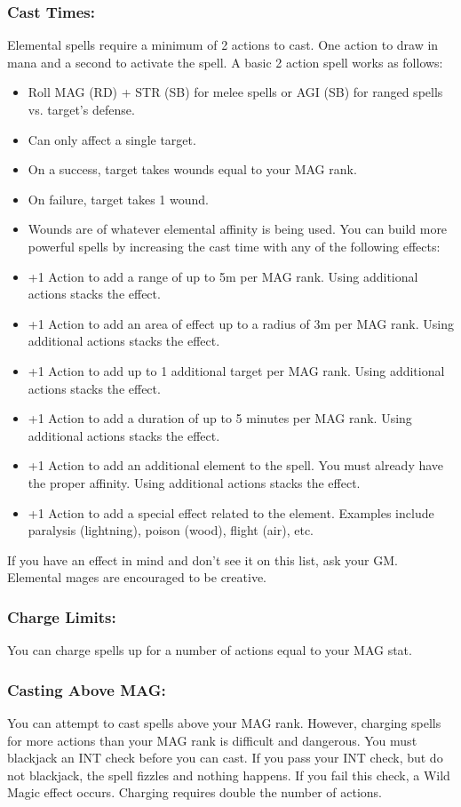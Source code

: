 \begin{pathele}
\subsubsection{Cast Times:}
	Elemental spells require a minimum of 2 actions to cast. One action to draw in mana and a second to activate the spell.
	A basic 2 action spell works as follows:
\begin{itemize}
\item Roll MAG (RD) + STR (SB) for melee spells or AGI (SB) for ranged spells vs. target's defense.
\item Can only affect a single target.
\item On a success, target takes wounds equal to your MAG rank.
\item On failure, target takes 1 wound.
\item Wounds are of whatever elemental affinity is being used.
	You can build more powerful spells by increasing the cast time with any of the following effects:
\item +1 Action to add a range of up to 5m per MAG rank. Using additional actions stacks the effect.
\item +1 Action to add an area of effect up to a radius of 3m per MAG rank. Using additional actions stacks the effect.
\item +1 Action to add up to 1 additional target per MAG rank. Using additional actions stacks the effect.
\item +1 Action to add a duration of up to 5 minutes per MAG rank. Using additional actions stacks the effect.
\item +1 Action to add an additional element to the spell. You must already have the proper affinity. Using additional actions stacks the effect.
\item +1 Action to add a special effect related to the element. Examples include paralysis (lightning), poison (wood), flight (air), etc.
\end{itemize}
	If you have an effect in mind and don't see it on this list, ask your GM. Elemental mages are encouraged to be creative.
\subsubsection{Charge Limits:}
	You can charge spells up for a number of actions equal to your MAG stat.
\subsubsection{Casting Above MAG:}
	You can attempt to cast spells above your MAG rank. However, charging spells for more actions than your MAG rank is difficult and dangerous.
	You must blackjack an INT check before you can cast. If you pass your INT check, but do not blackjack, the spell fizzles and nothing happens. If you fail this check, a Wild Magic effect occurs. Charging requires double the number of actions.

\end{pathele}
